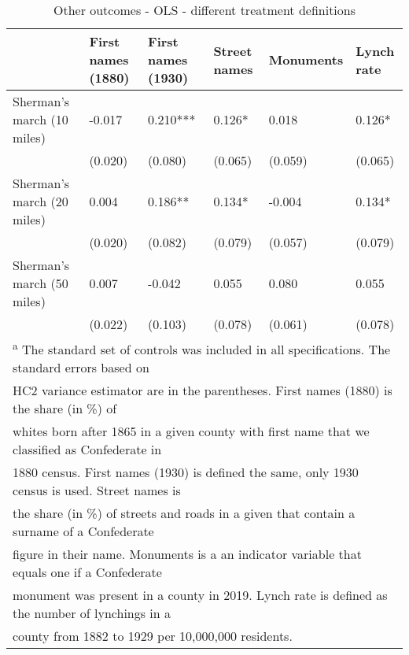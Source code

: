 \begin{table}[!h]

\caption{\label{tab:other_out_ols_diff_treat_def}Other outcomes - OLS - different treatment definitions}
\centering
\begin{tabular}[t]{llllll}
\toprule
 & First names (1880) & First names (1930) & Street names & Monuments & Lynch rate\\
\midrule
Sherman's march (10 miles) & -0.017 & 0.210*** & 0.126* & 0.018 & 0.126*\\
 & (0.020) & (0.080) & (0.065) & (0.059) & (0.065)\\
Sherman's march (20 miles) & 0.004 & 0.186** & 0.134* & -0.004 & 0.134*\\
 & (0.020) & (0.082) & (0.079) & (0.057) & (0.079)\\
Sherman's march (50 miles) & 0.007 & -0.042 & 0.055 & 0.080 & 0.055\\
 & (0.022) & (0.103) & (0.078) & (0.061) & (0.078)\\
\bottomrule
\multicolumn{6}{l}{\textsuperscript{a} The standard set of controls was included in all specifications. The standard errors based on}\\
\multicolumn{6}{l}{HC2 variance estimator are in the parentheses. First names (1880) is the share (in \%) of}\\
\multicolumn{6}{l}{whites born after 1865 in a given county with first name that we classified as Confederate in}\\
\multicolumn{6}{l}{1880 census. First names (1930) is defined the same, only 1930 census is used. Street names is}\\
\multicolumn{6}{l}{the share (in \%) of streets and roads in a given that contain a surname of a Confederate}\\
\multicolumn{6}{l}{figure in their name. Monuments is a an indicator variable that equals one if a Confederate}\\
\multicolumn{6}{l}{monument was present in a county in 2019. Lynch rate is defined as the number of lynchings in a}\\
\multicolumn{6}{l}{county from 1882 to 1929 per 10,000,000 residents.}\\
\end{tabular}
\end{table}